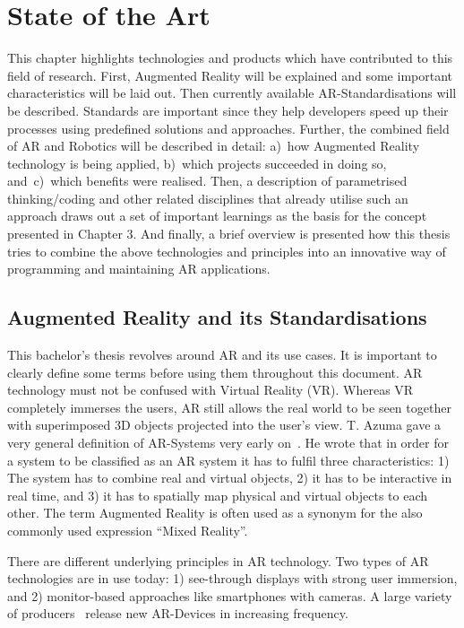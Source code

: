 \chapter{State of the Art}\label{Chap:StateOfTheArt}

This chapter highlights technologies and products which have contributed to this field of research. First, Augmented Reality will be explained and some important characteristics will be laid out. Then currently available AR-Standardisations will be described. Standards are  important since they help developers speed up their processes using predefined solutions and approaches. Further, the combined field of AR and Robotics will be described in detail: a)~how Augmented Reality technology is being applied, b)~which projects succeeded in doing so, and~c)~which benefits were realised. Then, a description of parametrised thinking/coding and other related disciplines that already utilise such an approach draws out a set of important learnings as the basis for the concept presented in Chapter 3. And finally, a brief overview is presented how this thesis tries to combine the above technologies and principles into an innovative way of programming and maintaining AR applications.

\section{Augmented Reality and its Standardisations}

This bachelor’s thesis revolves around AR and its use cases. It is important to clearly define some terms before using them throughout this document. AR technology must not be confused with Virtual Reality (VR). Whereas VR completely immerses the users, AR still allows the real world to be seen together with superimposed 3D objects projected into the user’s view. T. Azuma gave a very general definition of AR-Systems very early on~\cite{azuma1997survey}. He wrote that in order for a system to be classified as an AR system it has to fulfil three characteristics: 1) The system has to combine real and virtual objects, 2) it has to be interactive in real time, and 3) it has to spatially map physical and virtual objects to each other. The term Augmented Reality is often used as a synonym for the also commonly used expression “Mixed Reality”. 

There are different underlying principles in AR technology. Two types of AR technologies are in use today: 1) see-through displays with strong user immersion, and 2) monitor-based approaches like smartphones with cameras. A large variety of producers~\cite{ARProudcersVariety} release new AR-Devices in increasing frequency.


